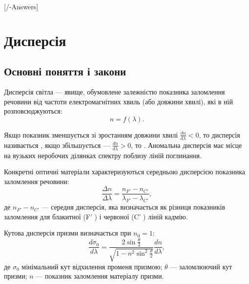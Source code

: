 
[\currfilebase/\currfilebase-Answers]
\chapter{Дисперсія}\label{\currfilebase}
\makeatletter
{}
\makeatother


\section{Основні поняття і закони}

Дисперсія світла --- явище, обумовлене залежністю показника
заломлення речовини від частоти електромагнітних хвиль (або довжини
хвилі), які в ній розповсюджуються:
\begin{equation}\label{}
	n = f(\lambda).
\end{equation}


Якщо показник зменшується зі зростанням довжини хвилі $\frac{dn}{d\lambda} < 0$,  то дисперсія називається ,  якщо збільшується --- $\frac{dn}{d\lambda} > 0$, то . Аномальна дисперсія має місце на вузьких неробочих
ділянках спектру поблизу ліній поглинання.

Конкретні оптичні матеріали характеризуються середньою
дисперсією показника заломлення речовини:
\begin{equation}\label{}
	\frac{\Delta n}{\Delta\lambda} = \frac{n_{F'} - n_{C'}}{\lambda_{F'} - \lambda_{C'}},
\end{equation}
де $n_{F'} - n_{C'}$ --- середня дисперсія, яка визначається як різниця показників заломлення для блакитної (F' ) і червоної (C' ) ліній кадмію.


Кутова дисперсія призми визначається при $n_0 = 1$:
\begin{equation}\label{eq:Prism_Dispersion}
	\frac{d\sigma_0}{d\lambda} = \frac{2\sin\frac\theta2}{\sqrt{1 - n^2\sin^2\frac\theta2}}\frac{dn}{d\lambda},
\end{equation}
де $\sigma_0$ мінімальний кут відхилення променя призмою; $\theta$ --- заломлюючий
кут призми; $n$ --- показник заломлення матеріалу призми.

